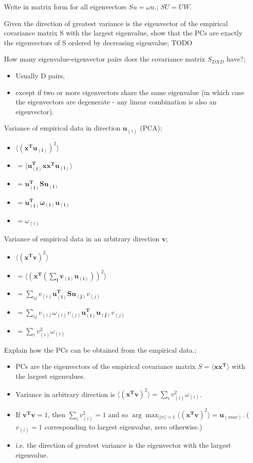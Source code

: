 \documentclass{article}
\begin{document}
Write in matrix form for all eigenvectors $Su = \omega u$.; $SU=UW$.

Given the direction of greatest variance is the eigenvector of the empirical covariance matrix S with the largest eigenvalue, show that the PCs are exactly the eigenvectors of S ordered by decreasing eigenvalue; TODO

How many eigenvalue-eigenvector pairs does the covariance matrix $S_{DXD}$ have?; \begin{itemize} \item Usually D pairs, \item except if two or more eigenvectors share the same eigenvalue (in which case the eigenvectors are degenerate - any linear combination is also an eigenvector).  \end{itemize}

Variance of empirical data in direction $\mathbf{u}_{(i)}$ (PCA); \begin{itemize} \item $\langle (\mathbf{x^Tu_{(i)}})^2\rangle $ \item $= \langle \mathbf{u_{(i)}^Txx^Tu_{(i)}}\rangle $ \item $=\mathbf{u_{(i)}^TSu_{(i)}}$ \item $=\mathbf{u_{(i)}^T\omega_{(i)}u_{(i)}}$ \item $=\omega_{(i)}$ \end{itemize}

Variance of empirical data in an arbitrary direction $\mathbf{v}$; \begin{itemize} \item $\langle (\mathbf{x^Tv})^2\rangle $ \item $= \langle (\mathbf{x^T(\sum_i v_{(i)}\mathbf{u}_{(i)})})^2\rangle $ \item $=\sum_{ij}v_{(i)}\mathbf{u_{(i)}^TSu_{(j)}}v_{(j)}$ \item $=\sum_{ij}v_{(i)}\omega_{(i)}v_{(j)}\mathbf{u_{(i)}^Tu_{(j)}}v_{(j)}$ \item $=\sum_i v_{(i)}^2\omega_{(i)}$ \end{itemize}

Explain how the PCs can be obtained from the empirical data.; \begin{itemize} \item PCs are the eigenvectors of the empirical covariance matrix $S=\langle\mathbf{xx^T}\rangle$ with the largest eigenvalues.  \item Variance in arbitrary direction is $\langle (\mathbf{x^Tv})^2\rangle =\sum_i v_{(i)}^2\omega_{(i)}$.  \item If $\mathbf{v^Tv}=1$, then $\sum_i v_{(i)}^2=1$ and so $\arg\max_{||v||=1} \langle (\mathbf{x^Tv})^2\rangle = \mathbf{u}_{(max)}$. ($v_{(i)}=1$ corresponding to largest eigenvalue, zero otherwise.) \item i.e. the direction of greatest variance is the eigenvector with the largest eigenvalue.  \end{itemize}
\end{document}

